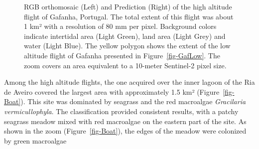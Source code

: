 \documentclass[
  number]{elsarticle}
\begin{document}
\label{cell-fig-GafHigh}
\begin{figure}[H]


\caption{\label{fig-GafHigh}RGB orthomosaic (Left) and Prediction
(Right) of the high altitude flight of Gafanha, Portugal. The total
extent of this flight was about 1 km² with a resolution of 80 mm per
pixel. Background colors indicate intertidal area (Light Green), land
area (Light Grey) and water (Light Blue). The yellow polygon shows the
extent of the low altitude flight of Gafanha presented in
Figure~\ref{fig-GafLow}. The zoom covers an area equivalent to a
10-meter Sentinel-2 pixel size.}

\end{figure}%

Among the high altitude flights, the one acquired over the inner lagoon
of the Ria de Aveiro covered the largest area with approximately 1.5 km²
(Figure~\ref{fig-Boat}). This site was dominated by seagrass and the red
macroalgae \emph{Gracilaria vermicullophyla}. The classification
provided consistent results, with a patchy seagrass meadow mixed with
red macroalgae on the eastern part of the site. As shown in the zoom
(Figure~\ref{fig-Boat}), the edges of the meadow were colonized by green
macroalgae
\end{document}
